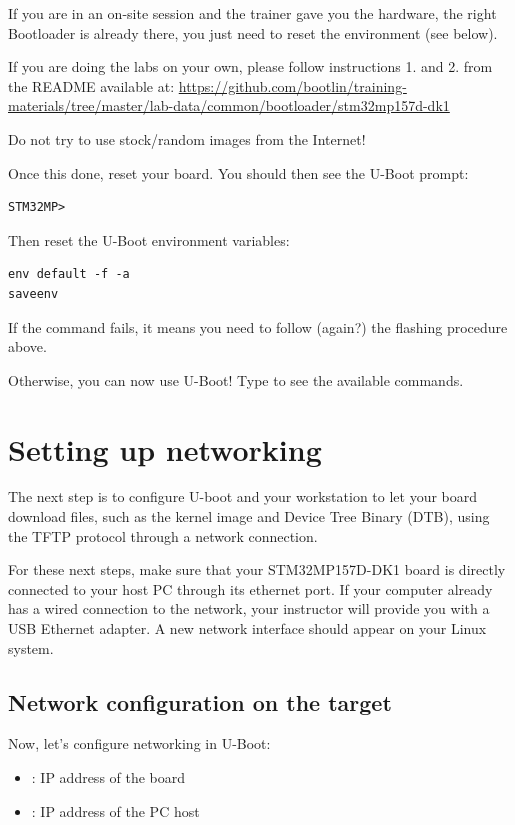 If you are in an on-site session and the trainer gave you the hardware,
the right Bootloader is already there, you just need to reset the
environment (see below).

If you are doing the labs on your own, please follow instructions 1. and
2. from the README available at:
\url{https://github.com/bootlin/training-materials/tree/master/lab-data/common/bootloader/stm32mp157d-dk1}

Do not try to use stock/random images from the Internet!

Once this done, reset your board.
You should then see the U-Boot prompt:

\begin{verbatim}
STM32MP>
\end{verbatim}

Then reset the U-Boot environment variables:

\begin{verbatim}
env default -f -a
saveenv
\end{verbatim}

If the  command fails, it means you need to follow
(again?) the flashing procedure above.

Otherwise, you can now use U-Boot! Type  to see the available
commands.

\section{Setting up networking}

The next step is to configure U-boot and your workstation to let your
board download files, such as the kernel image and Device Tree Binary
(DTB), using the TFTP protocol through a network connection.

For these next steps, make sure that your STM32MP157D-DK1 board is directly
connected to your host PC through its ethernet port. If your computer already
has a wired connection to the network, your instructor will provide you with
a USB Ethernet adapter. A new network interface should appear on your Linux system.

\subsection{Network configuration on the target}
Now, let's configure networking in U-Boot:

\begin{itemize}
  \item {}: IP address of the board
  \item {}: IP address of the PC host
\end{itemize}


